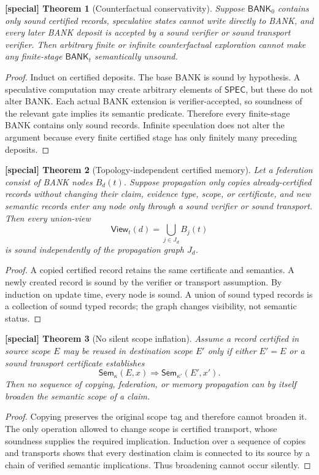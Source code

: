 \documentclass[11pt]{article}
\theoremstyle{special}
\newtheorem{specialthm}{[special] Theorem}[section]
\theoremstyle{definition}
\newcommand{\BANK}{\mathsf{BANK}}
\newcommand{\SPEC}{\mathsf{SPEC}}
\newcommand{\Sem}{\mathsf{Sem}}
\newcommand{\View}{\mathsf{View}}
\begin{document}
\begin{specialthm}[Counterfactual conservativity]
Suppose $\BANK_0$ contains only sound certified records, speculative states cannot write directly to BANK, and every later BANK deposit is accepted by a sound verifier or sound transport verifier. Then arbitrary finite or infinite counterfactual exploration cannot make any finite-stage $\BANK_t$ semantically unsound.
\end{specialthm}
\begin{proof}
Induct on certified deposits. The base BANK is sound by hypothesis. A speculative computation may create arbitrary elements of $\SPEC$, but these do not alter BANK. Each actual BANK extension is verifier-accepted, so soundness of the relevant gate implies its semantic predicate. Therefore every finite-stage BANK contains only sound records. Infinite speculation does not alter the argument because every finite certified stage has only finitely many preceding deposits.\qedhere
\end{proof}

\begin{specialthm}[Topology-independent certified memory]
Let a federation consist of BANK nodes $B_d(t)$. Suppose propagation only copies already-certified records without changing their claim, evidence type, scope, or certificate, and new semantic records enter any node only through a sound verifier or sound transport. Then every union-view
\[
\View_t(d)=\bigcup_{j\in J_d}B_j(t)
\]
is sound independently of the propagation graph $J_d$.
\end{specialthm}
\begin{proof}
A copied certified record retains the same certificate and semantics. A newly created record is sound by the verifier or transport assumption. By induction on update time, every node is sound. A union of sound typed records is a collection of sound typed records; the graph changes visibility, not semantic status.\qedhere
\end{proof}

\begin{specialthm}[No silent scope inflation]
Assume a record certified in source scope $E$ may be reused in destination scope $E'$ only if either $E'=E$ or a sound transport certificate establishes
\[
\Sem_\kappa(E,x)\Longrightarrow \Sem_{\kappa'}(E',x').
\]
Then no sequence of copying, federation, or memory propagation can by itself broaden the semantic scope of a claim.
\end{specialthm}
\begin{proof}
Copying preserves the original scope tag and therefore cannot broaden it. The only operation allowed to change scope is certified transport, whose soundness supplies the required implication. Induction over a sequence of copies and transports shows that every destination claim is connected to its source by a chain of verified semantic implications. Thus broadening cannot occur silently.\qedhere
\end{proof}
\end{document}
